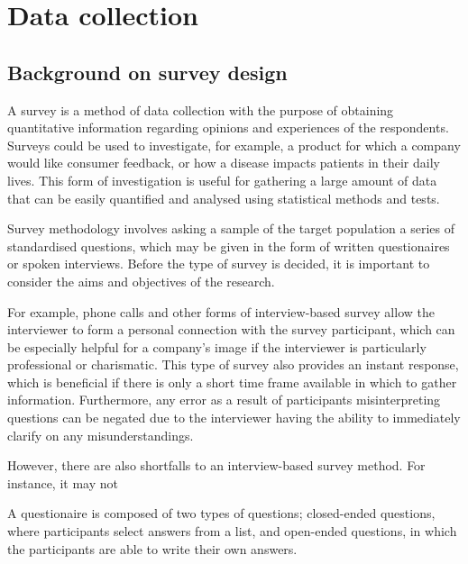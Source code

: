 \chapter{Data collection}

\section{Background on survey design}


A survey is a method of data collection with the purpose of obtaining quantitative information regarding opinions and 
experiences of the respondents. Surveys could be used to investigate, for example, a product for which a company would like 
consumer feedback, or how a disease impacts patients in their daily lives. This form of investigation is useful for gathering a
large amount of data that can be easily quantified and analysed using statistical methods and tests. 

Survey methodology involves asking a sample of the target population a series of standardised questions, which may be given in 
the form of written questionaires or spoken interviews. Before the type of survey is decided, it is important to consider the 
aims and objectives of the research. 

For example, phone calls and other forms of interview-based survey allow the interviewer to form a personal connection with 
the survey participant, which can be especially helpful for a company's image if the interviewer is particularly professional 
or charismatic. This type of survey also provides an instant response, which is beneficial if there is only a short time frame 
available in which to gather information. Furthermore, any error as a result of participants misinterpreting questions can be 
negated due to the interviewer having the ability to immediately clarify on any misunderstandings. 

However, there are also shortfalls to an interview-based survey method. For instance, it may not




A questionaire is composed of two types of questions; closed-ended questions, where participants select answers from a list,
and open-ended questions, in which the participants are able to write their own answers. 



